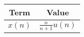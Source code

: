 
  \begin{tabular}{|c|c|}
    \hline
    \textbf{Term} & \textbf{Value} \\
    \hline
    $x(n)$ & $\frac{n}{n+1}$$u(n)$ \\
    \hline
  \end{tabular}
  
